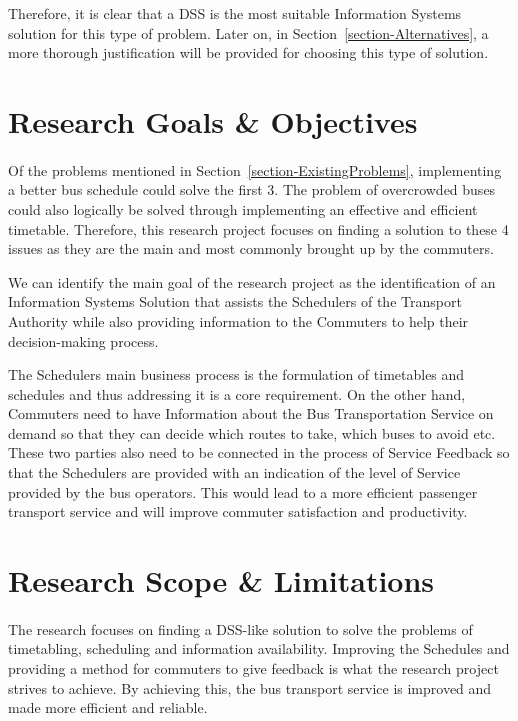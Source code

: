 Therefore, it is clear that a DSS is the most suitable Information Systems solution for this type of problem. Later on, in Section~\ref{section-Alternatives}, a more thorough justification will be provided for choosing this type of solution.

\section{Research Goals \& Objectives}
\label{section-ResearchGoalsAndObjectives}

\paragraph{ } Of the problems mentioned in Section~\ref{section-ExistingProblems}, implementing a better bus schedule could solve the first 3. The problem of overcrowded buses could also logically be solved through implementing an effective and efficient timetable. Therefore, this research project focuses on finding a solution to these 4 issues as they are the main and most commonly brought up by the commuters.

We can identify the main goal of the research project as the identification of an Information Systems Solution that assists the Schedulers of the Transport Authority while also providing information to the Commuters to help their decision-making process. 

The Schedulers main business process is the formulation of timetables and schedules and thus addressing it is a core requirement. On the other hand, Commuters need to have Information about the Bus Transportation Service on demand so that they can decide which routes to take, which buses to avoid etc. These two parties also need to be connected in the process of Service Feedback so that the Schedulers are provided with an indication of the level of Service provided by the bus operators. This would lead to a more efficient passenger transport service and will improve commuter satisfaction and productivity.

\section{Research Scope \& Limitations}
\label{section-ResearchScope}

\paragraph{ } The research focuses on finding a DSS-like solution to solve the problems of timetabling, scheduling and information availability. Improving the Schedules and providing a method for commuters to give feedback is what the research project strives to achieve. By achieving this, the bus transport service is improved and made more efficient and reliable. 

